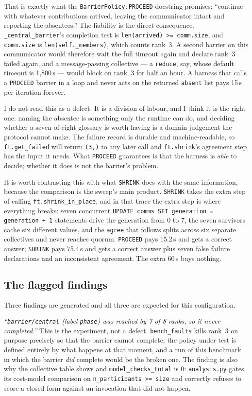 \documentclass[11pt]{article}
\begin{document}
That is exactly what the \texttt{BarrierPolicy.PROCEED} docstring promises: ``continue
with whatever contributions arrived, leaving the communicator intact and reporting the
absentees.'' The liability is the direct consequence. \texttt{\_central\_barrier}'s
completion test is \texttt{len(arrived) >= comm.size}, and \texttt{comm.size} is
\texttt{len(self.\_members)}, which counts rank~3. A second barrier on this communicator
would therefore wait the full timeout again and declare rank~3 failed again, and a
message-passing collective --- a \texttt{reduce}, say, whose default timeout is 1{,}800\,s
--- would block on rank~3 for half an hour. A harness that calls a \texttt{PROCEED}
barrier in a loop and never acts on the returned \texttt{absent} list pays 15\,s per
iteration forever.

I do not read this as a defect. It is a division of labour, and I think it is the right
one: naming the absentee is something only the runtime can do, and deciding whether a
seven-of-eight glossary is worth having is a domain judgement the protocol cannot make.
The failure record is durable and machine-readable, so \texttt{ft.get\_failed} will return
\texttt{(3,)} to any later call and \texttt{ft.shrink}'s agreement step has the input it
needs. What \texttt{PROCEED} guarantees is that the harness is \emph{able} to decide;
whether it does is not the barrier's problem.

It is worth contrasting this with what \texttt{SHRINK} does with the same information,
because the comparison is the sweep's main product. \texttt{SHRINK} takes the extra step
of calling \texttt{ft.shrink\_in\_place}, and in that trace the extra step is where
everything breaks: seven concurrent \texttt{UPDATE comms SET generation = generation + 1}
statements drive the generation from 0 to 7, the seven survivors cache six different
values, and the \texttt{agree} that follows splits across six separate collectives and
never reaches quorum. \texttt{PROCEED} pays 15.2\,s and gets a correct answer;
\texttt{SHRINK} pays 75.4\,s and gets a correct answer plus seven false failure
declarations and an inconsistent agreement. The extra 60\,s buys nothing.

\subsection{The flagged findings}

Three findings are generated and all three are expected for this configuration.

\emph{``\texttt{barrier/central} (label \texttt{phase}) was reached by 7 of 8 ranks, so it
never completed.''} This is the experiment, not a defect. \texttt{bench\_faults} kills
rank~3 on purpose precisely so that the barrier cannot complete; the policy under test is
defined entirely by what happens at that moment, and a run of this benchmark in which the
barrier \emph{did} complete would be the broken one. The finding is also why the collective
table shows \modelna{} and \texttt{model\_checks\_total} is 0:
\texttt{analysis.py} gates its cost-model comparison on \texttt{n\_participants >= size}
and correctly refuses to score a closed form against an invocation that did not happen.
\end{document}
